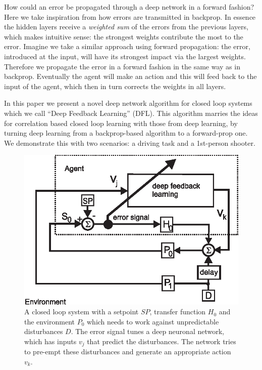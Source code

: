 \documentclass{aamas2018}
\begin{document}
How could an error be propagated through a deep network in a forward
fashion? Here we take inspiration from how errors are transmitted in
backprop. In essence the hidden layers receive a \textsl{weighted sum}
of the errors from the previous layers, which makes intuitive sense:
the strongest weights contribute the most to the error. Imagine we
take a similar approach using forward propagation: the error,
introduced at the input, will have its strongest impact via the
largest weights. Therefore we propagate the error in a forward fashion
in the same way as in backprop. Eventually the agent will make an
action and this will feed back to the input of the agent, which then
in turn corrects the weights in all layers.

In this paper we present a novel deep network algorithm for closed
loop systems which we call ``Deep Feedback Learning'' (DFL). This
algorithm marries the ideas for correlation based closed loop learning
with those from deep learning, by turning deep learning from a
backprop-based algorithm to a forward-prop one. We demonstrate this
with two scenarios: a driving task and a 1st-person shooter.

\begin{figure}[!ht]
  \centering
  \includegraphics[width=0.9\columnwidth]{closed_loop}
  \caption{A closed loop system with a setpoint $SP$, transfer function $H_0$ and the
    environment $P_0$ which needs to work against unpredictable disturbances $D$.
    The error signal tunes a deep neuronal network, which has inputs
    $v_j$ that predict the disturbances. The network tries to pre-empt these
    disturbances and generate an appropriate action $v_k$.
    \label{closed_loop}}
\end{figure}
\end{document}
